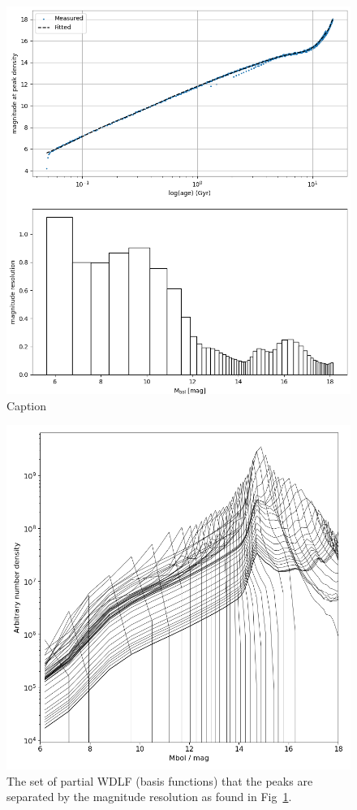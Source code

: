 \documentclass[fleqn,usenatbib]{mnras}
\begin{document}
\begin{figure}
    \includegraphics[width=\columnwidth]{figures/fig_04_magnitude_resoltuion.png}
    \caption{Caption}
    \label{fig:magnitude_resolution}
\end{figure}

\begin{figure}
    \includegraphics[width=\columnwidth]{figures/fig_05_basis_pwdlf.png}
    \caption{The set of partial WDLF (basis functions) that the peaks are separated by the magnitude resolution as found in Fig~\ref{fig:magnitude_resolution}.}
    \label{fig:basis_pwdlf}
\end{figure}
\end{document}
